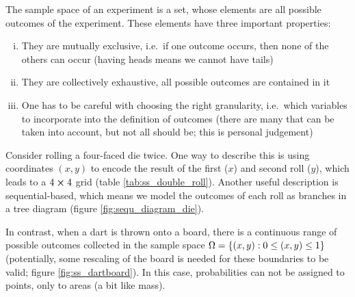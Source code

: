 \begin{defi}
The sample space of an experiment is a set, whose elements are all possible outcomes of the experiment. These elements have three important properties:
\begin{enumerate}[(i)]
\item They are mutually exclusive, i.e.~if one outcome occurs, then none of the others can occur (having heads means we cannot have tails)

\item They are collectively exhaustive, all possible outcomes are contained in it

\item One has to be careful with choosing the right granularity, i.e.~which variables to incorporate into the definition of outcomes (there are many that can be taken into account, but not all should be; this is personal judgement)
\end{enumerate}
\end{defi}



\begin{ex}
Consider rolling a four-faced die twice. One way to describe this is using coordinates $(x, y)$ to encode the result of the first ($x$) and second roll ($y$), which leads to a $4 \cross 4$ grid (table \ref{tab:ss_double_roll}). Another useful description is sequential-based, which means we model the outcomes of each roll as branches in a tree diagram (figure \ref{fig:sequ_diagram_die}).

In contrast, when a dart is thrown onto a board, there is a continuous range of possible outcomes collected in the sample space $\Omega = \qty{(x, y): 0 \leq (x, y) \leq 1}$ (potentially, some rescaling of the board is needed for these boundaries to be valid; figure \ref{fig:ss_dartboard}). In this case, probabilities can not be assigned to points, only to areas (a bit like mass).
\end{ex}



